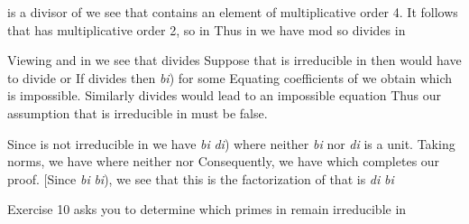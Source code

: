 \documentclass[11pt,oneside]{article}
\begin{document}
\begin{BookBody}

 is a divisor of  we see that  contains an element  of multiplicative order 4. It follows that  has multiplicative order 2, so  in  Thus in  we have mod  so  divides  in 

Viewing  and  in  we see that  divides  Suppose that  is irreducible in  then  would have to divide  or  If  divides  then  \textit{bi}) for some  Equating coefficients of  we obtain  which is impossible. Similarly divides  would lead to an impossible equation  Thus our assumption that  is irreducible in  must be false.

Since  is not irreducible in  we have  \textit{bi} \textit{di}) where neither  \textit{bi} nor  \textit{di} is a unit. Taking norms, we have  where neither  nor  Consequently, we have  which completes our proof. [Since  \textit{bi} \textit{bi}), we see that this is the factorization of  that is \textit{di}  \textit{bi}\BookInline{.]}\BookEnd{\blacklozenge}

\noindent Exercise 10 asks you to determine which primes  in  remain irreducible in 

\end{BookBody}

\BookNarrativefalse
\end{document}
